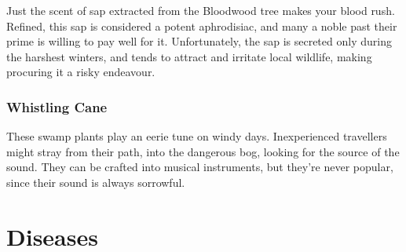 \begin{multicols}{2}
Just the scent of sap extracted from the Bloodwood tree makes your blood rush. Refined, this sap is considered a potent aphrodisiac, 
and many a noble past their prime is willing to pay well for it. Unfortunately, the sap is secreted only during the harshest winters, 
and tends to attract and irritate local wildlife, making procuring it a risky endeavour.

\subsubsection{Whistling Cane}
\label{whistlingCane}

These swamp plants play an eerie tune on windy days. Inexperienced travellers might stray from their path, into the dangerous bog, 
looking for the source of the sound. They can be crafted into musical instruments, but they're never popular, since their sound is 
always sorrowful.

\end{multicols}

\section{Diseases}
\label{diseases}

\newcommand\newDisease[1]{
  \subsubsection{#1}
  \index{#1 (Disease)}
  \label{#1}
}

